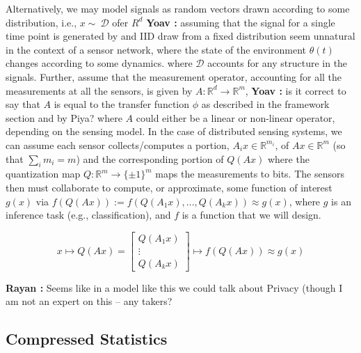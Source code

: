 \documentclass{article}
\newcommand{\comment}[3]{{\color{#1} {\bf #2 :} #3}}
\newcommand{\yoav}[1]{\comment{magenta}{Yoav}{#1}}
\newcommand{\rayan}[1]{\comment{red}{Rayan}{#1}}
\begin{document}
Alternatively, we may model signals as random vectors drawn according
to some distribution, i.e., $x\sim~\mathcal{D}$ ofer $R^d$
\yoav{assuming that the signal for a single time point is generated by
  and IID draw from a fixed distribution seem unnatural in the context
  of a sensor network, where the state of the environment $\theta(t)$
  changes according to some dynamics.} where $\mathcal{D}$ accounts
for any structure in the signals. Further, assume that the measurement
operator, accounting for all the measurements at all the sensors, is
given by $A:\mathbb{R}^d \to \mathbb{R}^m$, \yoav{is it correct to say
  that $A$ is equal to the transfer function $\phi$ as described in
  the framework section and by Piya?} where $A$ could either be
a linear or non-linear operator, depending on the sensing model.  In
the case of distributed sensing systems, we can assume each sensor
collects/computes a portion, $A_i x \in \mathbb{R}^{m_i}$, of $Ax \in
\mathbb{R}^m$ (so that $\sum_i{m_i}=m$) and the corresponding portion
of ${Q}(Ax)$ where the quantization map $Q: \mathbb{R}^m \to \{\pm
1\}^m $ maps the measurements to bits. The sensors then must
collaborate to compute, or approximate, some function of interest
$g(x)$ via $f(Q(Ax)):=f\left(Q(A_1x),...,Q(A_kx)\right)\approx g(x)$,
where $g$ is an inference task (e.g., classification), and $f$ is a
function that we will design.

\begin{equation}
x 
\mapsto Q(Ax) =\left[ \begin{array}{c} Q(A_1 x) \\ \vdots \\ Q(A_k x) \end{array}\right] \mapsto f(Q(Ax))\approx g(x)
\end{equation}


\rayan{ Seems like in a model like this we could talk about Privacy (though I am not an expert on this -- any takers?} 


\subsection{Compressed Statistics}
\end{document}
